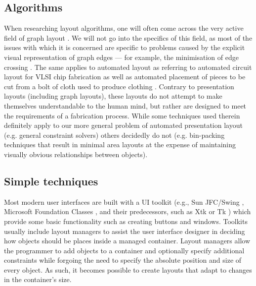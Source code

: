    \subsection{Algorithms}
    \label{related-algorithms}

    When researching layout algorithms, one will often come across the very
    active field of graph layout \citep{battista-1}. We will not go into the
    specifics of this field, as most of the issues with which it is concerned
    are specific to problems caused by the explicit visual representation of
    graph edges --- for example, the minimisation of edge crossing
    \citep{battista-2, shahrokhi-1}. The same applies to automated layout as
    referring to automated circuit layout for VLSI chip fabrication
    \citep{hu-1, lengauer-1} as well as automated placement of pieces to be cut
    from a bolt of cloth used to produce clothing \citep{milenkovic-1}.
    Contrary to presentation layouts (including graph layouts), these layouts
    do not attempt to make themselves understandable to the human mind, but
    rather are designed to meet the requirements of a fabrication process.
    While some techniques used therein definitely apply to our more general
    problem of automated presentation layout (e.g. general constraint solvers)
    others decidedly do not (e.g.  bin-packing techniques \citep{hofri-1} that
    result in minimal area layouts at the expense of maintaining visually
    obvious relationships between objects).

   \subsection{Simple techniques}
    \label{simple-techniques}

    Most modern user interfaces are built with a UI toolkit (e.g., Sun
    JFC/Swing \citep{sun-1}, Microsoft Foundation Classes \citep{microsoft-1},
    and their predecessors, such as Xtk \citep{mccormack-1} or Tk
    \citep{ousterhout-1}) which provide some basic functionality such as
    creating buttons and windows. Toolkits usually include layout managers to
    assist the user interface designer in deciding how objects should be places
    inside a managed container.  Layout managers allow the programmer to add
    objects to a container and optionally specify additional constraints while
    forgoing the need to specify the absolute position and size of every
    object.  As such, it becomes possible to create layouts that adapt to
    changes in the container’s size.

